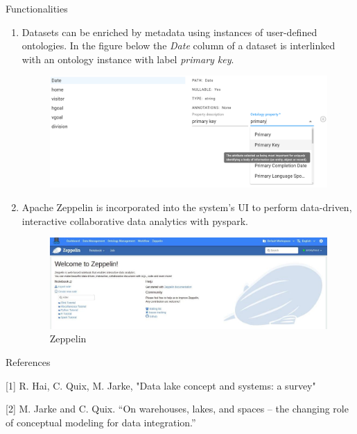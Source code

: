 \documentclass[12pt]{beamer}
\begin{document}
\begin{textblock}{0.5}
\begin{block}{Functionalities}
\begin{enumerate}
\item Datasets can be enriched by metadata using instances of user-defined ontologies. In the figure below the \textit{Date} column of a dataset is interlinked with an ontology instance with label \textit{primary key}.
\begin{figure}[H]
	\includegraphics[width=0.9\linewidth]{annotation.PNG} 
	\label{WorkFlow}
\end{figure}   
    
\item Apache Zeppelin is incorporated into the system's UI to perform data-driven,
interactive collaborative data analytics with pyspark.

\begin{figure}[H]
\includegraphics{zeppelin.jpeg}
\caption{Zeppelin} \label{Figure 1}
\end{figure} 
\end{enumerate}

\end{block}

\vfill\vspace{7.5mm} %
\begin{block}{References}
\item{[1] R. Hai, C. Quix, M. Jarke, "Data lake concept and systems: a survey"}
\item{[2] M. Jarke and C. Quix. “On warehouses, lakes, and spaces – the changing role of conceptual modeling for data integration.”}
\end{block}

\end{textblock}
\end{document}
